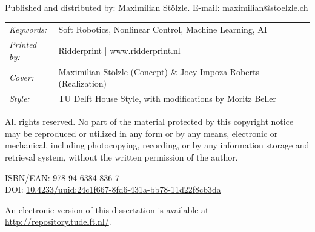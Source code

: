 \begin{titlepage}
\noindent Published and distributed by: Maximilian Stölzle. E-mail: \href{mailto:maximilian@stoelzle.ch}{maximilian@stoelzle.ch}\\

\noindent
\begin{tabular}{@{}p{}@{}p{}}
  \textit{Keywords:} & Soft Robotics, Nonlinear Control, Machine Learning, AI \\[\medskipamount]
      \textit{Printed by:} & Ridderprint | \url{www.ridderprint.nl} \\[\medskipamount]
      \textit{Cover:} & Maximilian Stölzle (Concept) \& Joey Impoza Roberts (Realization) \\[\medskipamount]
      \textit{Style:} & TU Delft House Style, with modifications by Moritz Beller \\[\medskipamount] %
\end{tabular}

\medskip
\medskip
\noindent All rights reserved. No part of the material protected by this copyright notice may be reproduced or utilized in any form or by any means, electronic or mechanical, including photocopying, recording, or by any information storage and retrieval system, without the written permission of the author.

\vspace{\bigskipamount}



\noindent ISBN/EAN: 978-94-6384-836-7\\
\noindent DOI: \href{https://doi.org/10.4233/uuid:24c1f667-8fd6-431a-bb78-11d22f8cb3da}{10.4233/uuid:24c1f667-8fd6-431a-bb78-11d22f8cb3da}

\medskip
\noindent An electronic version of this dissertation is available at \\
\url{http://repository.tudelft.nl/}.

\end{titlepage}

